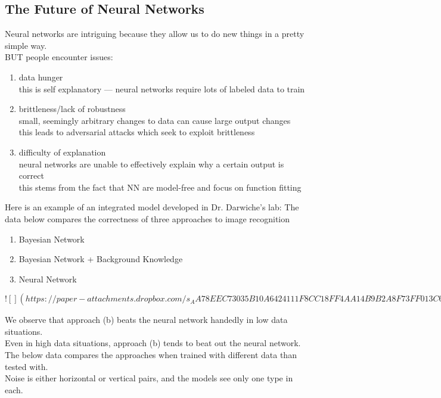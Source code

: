 \documentclass[../../lecture_notes.tex]{subfiles}
\begin{document}
\subsection*{The Future of Neural Networks}
\noindent Neural networks are intriguing because they allow us to do new things in a pretty simple way.\\
BUT people encounter issues:
	\begin{enumerate} [itemsep=0mm]
		\item data hunger\\
			this is self explanatory — neural networks require lots of labeled data to train
		\item brittleness/lack of robustness\\
			small, seemingly arbitrary changes to data can cause large output changes\\
			this leads to adversarial attacks which seek to exploit brittleness
		\item difficulty of explanation\\
			neural networks are unable to effectively explain why a certain output is correct\\
			this stems from the fact that NN are model-free and focus on function fitting
	\end{enumerate}\medskip

\noindent Here is an example of an integrated model developed in Dr. Darwiche’s lab:
The data below compares the correctness of three approaches to image recognition
	\begin{enumerate} [itemsep=0mm]
		\item Bayesian Network
		\item Bayesian Network + Background Knowledge
		\item Neural Network
	\end{enumerate}

\newpage
$![](https://paper-attachments.dropbox.com/s_AA78EEC73035B10A6424111F8CC18FF4AA14B9B2A8F73FF013C6765837E92F61_1591304763546_Untitled+drawing+4.jpg)$
\newpage

\noindent We observe that approach (b) beats the neural network handedly in low data situations.\\
Even in high data situations, approach (b) tends to beat out the neural network.\\

The below data compares the approaches when trained with different data than tested with.\\
Noise is either horizontal or vertical pairs, and the models see only one type in each.\\
\end{document}
